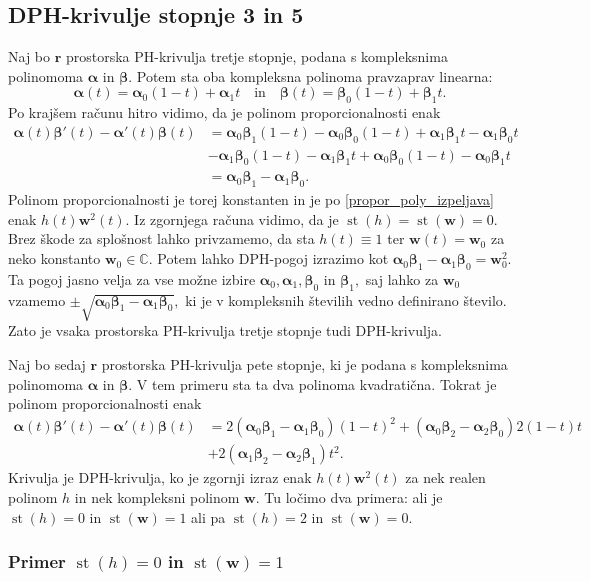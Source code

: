 \documentclass[12pt,a4paper,twoside]{article}
\theoremstyle{definition} %
\theoremstyle{plain} %
\theoremstyle{primerstyle}
\numberwithin{equation}{section}  %
\renewcommand{\C}{\mathbb C}
\newcommand{\rV}{\mathbf{r}}
\newcommand{\wV}{\mathbf{w}}
\newcommand{\balpha}{\boldsymbol \alpha}
\newcommand{\bbeta}{\boldsymbol \beta}
\DeclareMathOperator{\st}{st}
\begin{document}
\subsection{DPH-krivulje stopnje 3 in 5}

Naj bo $\rV$ prostorska PH-krivulja tretje stopnje, podana s kompleksnima polinomoma $\balpha$ in $\bbeta.$ Potem sta oba kompleksna polinoma pravzaprav linearna: $$\balpha(t)=\balpha_0(1-t)+\balpha_1t\quad\text{in}\quad\bbeta(t)=\bbeta_0(1-t)+\bbeta_1t.$$ Po krajšem računu hitro vidimo, da je polinom proporcionalnosti enak
\begin{align*}
	\balpha(t)\bbeta'(t)-\balpha'(t)\bbeta(t)&=\balpha_0\bbeta_1(1-t)-\balpha_0\bbeta_0(1-t)+\balpha_1\bbeta_1t-\balpha_1\bbeta_0t\\
	&-\balpha_1\bbeta_0(1-t)-\balpha_1\bbeta_1t+\balpha_0\bbeta_0(1-t)-\balpha_0\bbeta_1t\\
	&=\balpha_0\bbeta_1-\balpha_1\bbeta_0.
\end{align*}
Polinom proporcionalnosti je torej konstanten in je po \eqref{propor_poly_izpeljava} enak $h(t)\wV^2(t).$ Iz zgornjega računa vidimo, da je $\st(h)=\st(\wV)=0.$ Brez škode za splošnost lahko privzamemo, da sta $h(t)\equiv1$ ter $\wV(t)=\wV_0$ za neko konstanto $\wV_0\in\C.$ Potem lahko DPH-pogoj izrazimo kot $\balpha_0\bbeta_1-\balpha_1\bbeta_0=\wV_0^2.$ Ta pogoj jasno velja za vse možne izbire $\balpha_0,\balpha_1,\bbeta_0$ in $\bbeta_1,$ saj lahko za $\wV_0$ vzamemo $\pm\sqrt{\balpha_0\bbeta_1-\balpha_1\bbeta_0},$ ki je v kompleksnih številih vedno definirano število. Zato je vsaka prostorska PH-krivulja tretje stopnje tudi DPH-krivulja.

Naj bo sedaj $\rV$ prostorska PH-krivulja pete stopnje, ki je podana s kompleksnima polinomoma $\balpha$ in $\bbeta.$ V tem primeru sta ta dva polinoma kvadratična. Tokrat je polinom proporcionalnosti enak
\begin{align}
	\balpha(t)\bbeta'(t)-\balpha'(t)\bbeta(t)&=2(\balpha_0\bbeta_1-\balpha_1\bbeta_0)(1-t)^2+(\balpha_0\bbeta_2-\balpha_2\bbeta_0)2(1-t)t\nonumber\\
	&+2(\balpha_1\bbeta_2-\balpha_2\bbeta_1)t^2.\label{propoly_bern_5}
\end{align}
Krivulja je DPH-krivulja, ko je zgornji izraz enak $h(t)\wV^2(t)$ za nek realen polinom $h$ in nek kompleksni polinom $\wV.$ Tu ločimo dva primera: ali je $\st(h)=0$ in $\st(\wV)=1$ ali pa $\st(h)=2$ in $\st(\wV)=0.$

\subsubsection{Primer \texorpdfstring{$\st(h)=0$}{st(h)=0} in \texorpdfstring{$\st(\wV)=1$}{st(w)=1}}
\end{document}
